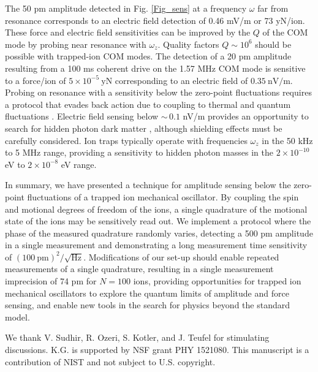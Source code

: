 \documentclass[aps,prl,twocolumn,superscriptaddress,floatfix]{revtex4-1}
\begin{document}
The 50 pm amplitude detected in Fig. \ref{Fig_sens} at a frequency $\omega$ far from resonance corresponds to an electric field detection of 0.46 mV/m or 73 yN/ion. These force and electric field sensitivities can be improved by the $Q$ of the COM mode by probing near resonance with $\omega_z$. Quality factors $Q\sim 10^6$ should be possible with trapped-ion COM modes. The detection of a 20 pm amplitude resulting from a 100 ms coherent drive on the 1.57 MHz COM mode is sensitive to a force/ion of $5\times10^{-5}\:\mathrm{yN}$ corresponding to an electric field of $0.35\:\mathrm{nV/m}$. Probing on resonance with a sensitivity below the zero-point fluctuations requires a protocol that evades back action due to coupling to thermal and quantum fluctuations \citep{Hempel2013}. Electric field sensing below ${\sim} \,0.1$ nV/m provides an opportunity to search for hidden photon dark matter \citep{Arias2012,Chaudhuri2015}, although shielding effects must be carefully considered. Ion traps typically operate with frequencies $\omega_z$ in the 50 kHz to 5 MHz range, providing a sensitivity to hidden photon masses in the $2 \times 10^{-10}$ eV to $2 \times 10^{-8}$ eV range.

In summary, we have presented a technique for amplitude sensing below the zero-point fluctuations of a trapped ion mechanical oscillator. By coupling
the spin and motional degrees of freedom of the ions, a single quadrature of the motional state of the ions may be sensitively read out. We implement a 
protocol where the phase of the measured quadrature randomly varies, detecting a 500 pm amplitude in a single measurement
and demonstrating a long measurement time sensitivity of $\left(100\:\mathrm{pm}\right)^{2}/\sqrt{\mathrm{Hz}}$. Modifications of our set-up should enable repeated measurements of a single quadrature, resulting in a single measurement
imprecision of 74 pm for $N = 100$ ions, providing opportunities for
trapped ion mechanical oscillators to explore the quantum limits of amplitude and force sensing, and enable new tools in the search for physics beyond the standard model.

\begin{acknowledgments}
We thank V. Sudhir, R. Ozeri, S. Kotler, and J. Teufel for stimulating discussions. K.G. is supported by NSF grant PHY 1521080. This manuscript is a contribution of NIST and not subject to U.S. copyright.
\end{acknowledgments}



\end{document}
